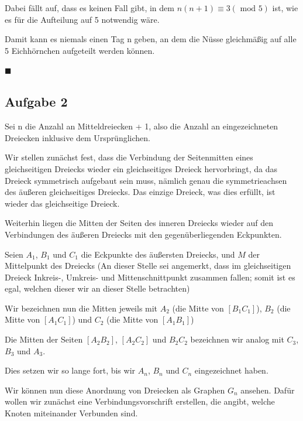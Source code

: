 \documentclass[11pt]{article}
\begin{document}
    Dabei fällt auf, dass es keinen Fall gibt, in dem $n(n+1) \equiv 3 (\text{ mod } 5)$ ist, wie es für die
    Aufteilung auf 5 notwendig wäre.

    Damit kann es niemals einen Tag n geben, an dem die Nüsse gleichmäßig auf alle 5 Eichhörnchen aufgeteilt werden
    können.

    $\blacksquare$

    \newpage

    \subsection*{Aufgabe 2}

    Sei n die Anzahl an Mitteldreiecken + 1, also die Anzahl an eingezeichneten Dreiecken inklusive dem Ursprünglichen.

    \bigskip

    Wir stellen zunächst fest, dass die Verbindung der Seitenmitten eines gleichseitigen Dreiecks
    wieder ein gleichseitiges Dreieck hervorbringt,
    da das Dreieck symmetrisch aufgebaut sein muss, nämlich genau die symmetrieachsen des äußeren gleichseitiges
    Dreiecks.
    Das einzige Dreieck, was dies erfüllt, ist wieder das gleichseitige Dreieck.

    Weiterhin liegen die Mitten der Seiten des inneren Dreiecks wieder auf den Verbindungen des äußeren Dreiecks
    mit den gegenüberliegenden Eckpunkten.

    \bigskip

    Seien $A_1$, $B_1$ und $C_1$ die Eckpunkte des äußersten Dreiecks, und $M$ der Mittelpunkt des Dreiecks
    (An dieser Stelle sei angemerkt, dass im gleichseitigen Dreieck Inkreis-, Umkreis- und Mittenschnittpunkt
    zusammen fallen;
    somit ist es egal, welchen dieser wir an dieser Stelle betrachten)

    Wir bezeichnen nun die Mitten jeweils mit $A_2$ (die Mitte von $[B_1C_1]$), $B_2$ (die Mitte von $[A_1C_1]$)
    und $C_2$ (die Mitte von $[A_1B_1]$)

    Die Mitten der Seiten $[A_2B_2]$, $[A_2C_2]$ und $B_2C_2$ bezeichnen wir analog mit $C_3$, $B_3$ und $A_3$.

    Dies setzen wir so lange fort, bis wir $A_n$, $B_n$ und $C_n$ eingezeichnet haben.

    \bigskip

    Wir können nun diese Anordnung von Dreiecken als Graphen $G_n$ ansehen.
    Dafür wollen wir zunächst eine Verbindungsvorschrift erstellen, die angibt, welche Knoten
    miteinander Verbunden sind.
\end{document}
